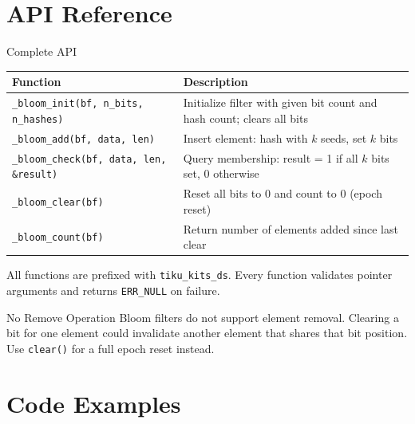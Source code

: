 \documentclass[aspectratio=169, 10pt]{beamer}
\begin{document}
\section{API Reference}

\begin{frame}[fragile]{Complete API}
\begin{table}
\centering
\small
\begin{tabular}{@{}lp{8cm}@{}}
\toprule
\textbf{Function} & \textbf{Description} \\
\midrule
\texttt{\_bloom\_init(bf, n\_bits, n\_hashes)}
  & Initialize filter with given bit count and hash count; clears all bits \\
\midrule
\texttt{\_bloom\_add(bf, data, len)}
  & Insert element: hash with $k$ seeds, set $k$ bits \\
\texttt{\_bloom\_check(bf, data, len, \&result)}
  & Query membership: result = 1 if all $k$ bits set, 0 otherwise \\
\midrule
\texttt{\_bloom\_clear(bf)}
  & Reset all bits to 0 and count to 0 (epoch reset) \\
\texttt{\_bloom\_count(bf)}
  & Return number of elements added since last clear \\
\bottomrule
\end{tabular}
\end{table}

\vspace{0.3em}
{\scriptsize All functions are prefixed with \texttt{tiku\_kits\_ds}.
Every function validates pointer arguments and returns \texttt{ERR\_NULL} on failure.}

\begin{alertblock}{No Remove Operation}
Bloom filters do not support element removal. Clearing a bit for one
element could invalidate another element that shares that bit position.
Use \texttt{clear()} for a full epoch reset instead.
\end{alertblock}
\end{frame}

\section{Code Examples}
\end{document}
